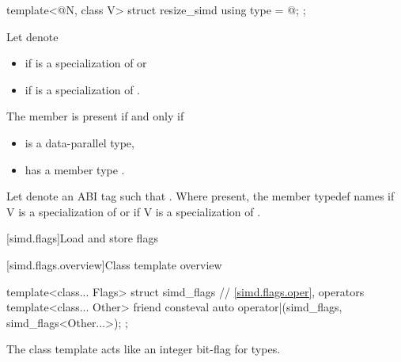 \begin{itemdecl}
template<@\simdsizetype@ N, class V> struct resize_simd { using type = @\seebelow@; };
\end{itemdecl}

\begin{itemdescr}
  \pnum Let  denote
  \begin{itemize}
    \item {} if  is a specialization of
       or
    \item {} if  is a
      specialization of .
  \end{itemize}

  \pnum
  The member  is present if and only if
  \begin{itemize}
    \item {} is a data-parallel type,
    \item {} has a member type .
  \end{itemize}

  \pnum
  Let  denote an ABI tag such that .
  Where present, the member typedef  names  if \tcode V is a specialization of  or
   if \tcode V is a specialization of
  .
\end{itemdescr}

[simd.flags]{Load and store flags}

[simd.flags.overview]{Class template  overview}


\begin{codeblock}
template<class... Flags> struct simd_flags {
  // \ref{simd.flags.oper},  operators
  template<class... Other>
    friend consteval auto operator|(simd_flags, simd_flags<Other...>);
};
\end{codeblock}

\pnum
\begin{note}
The class template  acts like an integer bit-flag for types.
\end{note}

